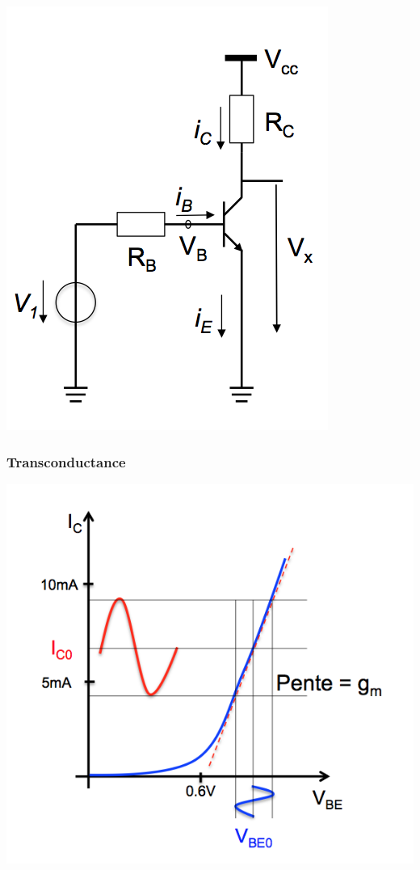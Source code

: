 \documentclass[]{article}
\begin{document}
\includegraphics[scale=0.5]{inverseur}

\subsubsection{Transconductance}

\includegraphics[scale=0.5]{transconductance.png}
\end{document}
